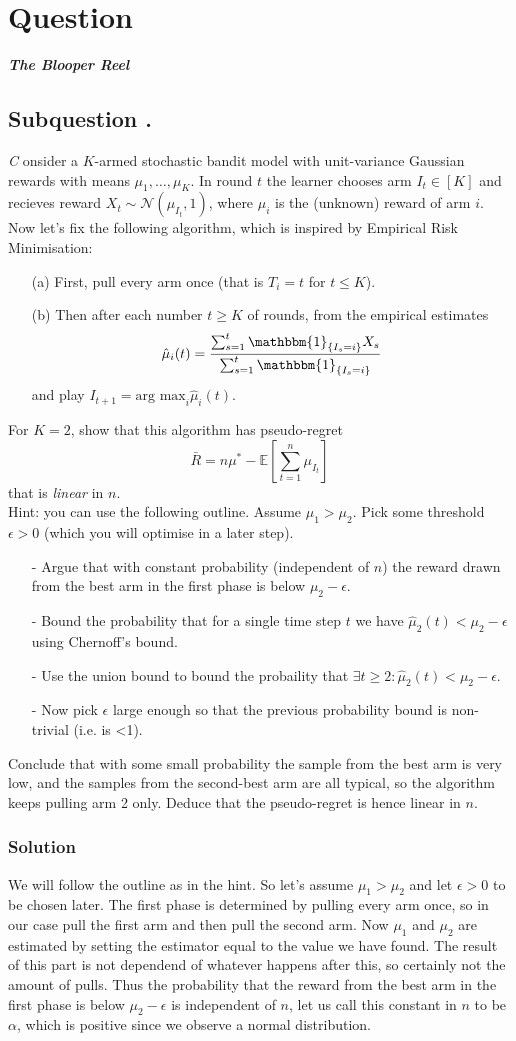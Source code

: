 \documentclass{article}
\newcounter{counterquestion}
\newenvironment{question}[1]
{
\stepcounter{counterquestion}
\section*{Question \thecounterquestion}
\emph{#1} 
} 
{
}
\newcounter{countersubquestion}[counterquestion]
\newenvironment{subquestion}[1]
{
\stepcounter{countersubquestion}
\subsection*{Subquestion \thecounterquestion .\thecountersubquestion}
\emph{#1} 
} 
{
}
\newenvironment{solution}
{
\subsubsection*{Solution}
} 
{
}
\begin{document}
\begin{question}{\textbf{The Blooper Reel}}
\begin{subquestion}
Consider a $K$-armed stochastic bandit model with unit-variance Gaussian rewards with means $\mu _1, \dots , \mu_K$. In round $t$ the learner chooses arm $I_t\in [K]$ and recieves reward $X_t \sim \mathcal{N}(\mu _{I_t} , 1)$, where $\mu _i$ is the (unknown) reward of arm $i$. Now let's fix the following algorithm, which is inspired by Empirical Risk Minimisation:
\begin{enumerate}
\item [(a)] First, pull every arm once (that is $T_i=t$ for $t\leq K$).
\item [(b)] Then after each number $t\geq K$ of rounds, from the empirical estimates $$\hat{\mu}_i(t)=\frac{\sum _{s=1}^t\mathbbm{1}_{\{I_s=i \}}X_s}{\sum _{s=1}^t \mathbbm{1}_{\{I_s=i\}}}$$ and play $I_{t+1}=\text{arg max}_i\hat{\mu}_i(t)$.
\end{enumerate}
For $K=2$, show that this algorithm has pseudo-regret $$\bar{R}=n\mu ^* - \mathbb{E}[\sum _{t=1}^n \mu _{I_t}]$$
that is \textit{linear} in $n$.\\
Hint: you can use the following outline. Assume $\mu _1 > \mu _2$. Pick some threshold $\epsilon >0$ (which you will optimise in a later step).
\begin{enumerate}
\item [-] Argue that with constant probability (independent of $n$) the reward drawn from the best arm in the first phase is below $\mu _2-\epsilon$.
\item [-] Bound the probability that for a single time step $t$ we have $\hat{\mu}_2(t)<\mu_2-\epsilon$ using Chernoff's bound.
\item [-] Use the union bound to bound the probaility that $\exists t \geq 2: \hat{\mu} _2(t)<\mu_2 - \epsilon$.
\item [-] Now pick $\epsilon$ large enough so that the previous probability bound is non-trivial (i.e. is <1).
\end{enumerate}
Conclude that with some small probability the sample from the best arm is very low, and the samples from the second-best arm are all typical, so the algorithm keeps pulling arm 2 only. Deduce that the pseudo-regret is hence linear in $n$.
\end{subquestion}
\begin{solution}
We will follow the outline as in the hint. So let's assume $\mu_1>\mu_2$ and let $\epsilon>0$ to be chosen later. The first phase is determined by pulling every arm once, so in our case pull the first arm and then pull the second arm. Now $\mu _1 $ and $\mu _2$ are estimated by setting the estimator equal to the value we have found. The result of this part is not dependend of whatever happens after this, so certainly not the amount of pulls. Thus the probability that the reward from the best arm in the first phase is below $\mu _2 - \epsilon$ is independent of $n$, let us call this constant in $n$ to be $\alpha$, which is positive since we observe a normal distribution.\\

\end{solution}
\end{question}
\end{document}
